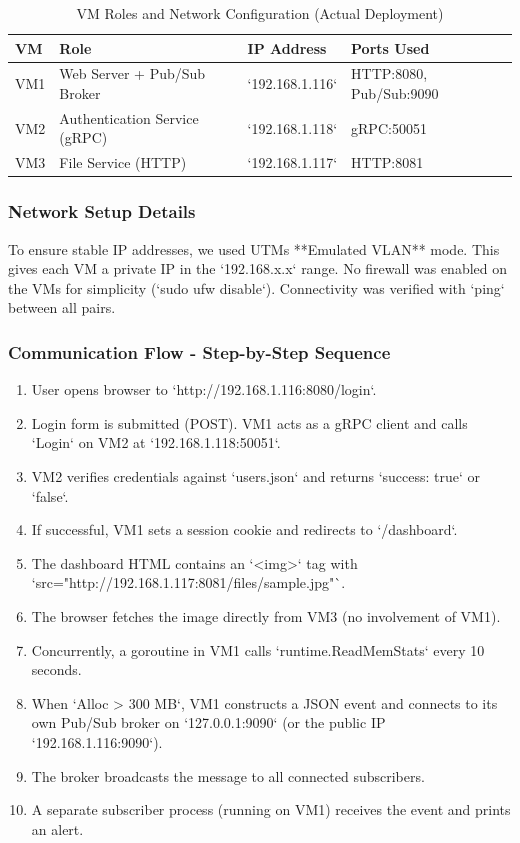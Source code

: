 \documentclass[a4paper]{article}
\begin{document}
\begin{table}[H]
\centering
\caption{VM Roles and Network Configuration (Actual Deployment)}
\label{tab:vmconfig}\begin{tabular}{|l|l|l|l|}
\hline
\textbf{VM} & \textbf{Role} & \textbf{IP Address} & \textbf{Ports Used} \\ \hline
VM1 & Web Server + Pub/Sub Broker & `192.168.1.116` & HTTP:8080, Pub/Sub:9090 \\ \hline
VM2 & Authentication Service (gRPC) & `192.168.1.118` & gRPC:50051 \\ \hline
VM3 & File Service (HTTP) & `192.168.1.117` & HTTP:8081 \\ \hline
\end{tabular}
\end{table}

\subsubsection{Network Setup Details}
To ensure stable IP addresses, we used UTMs **Emulated VLAN** mode. This gives each VM a private IP in the `192.168.x.x` range. No firewall was enabled on the VMs for simplicity (`sudo ufw disable`). Connectivity was verified with `ping` between all pairs.

\subsubsection{Communication Flow - Step-by-Step Sequence}
\begin{enumerate}
    \item User opens browser to `http://192.168.1.116:8080/login`.
    \item Login form is submitted (POST). VM1 acts as a gRPC client and calls `Login` on VM2 at `192.168.1.118:50051`.
    \item VM2 verifies credentials against `users.json` and returns `success: true` or `false`.
    \item If successful, VM1 sets a session cookie and redirects to `/dashboard`.
    \item The dashboard HTML contains an `<img>` tag with `src="http://192.168.1.117:8081/files/sample.jpg"`.
    \item The browser fetches the image directly from VM3 (no involvement of VM1).
    \item Concurrently, a goroutine in VM1 calls `runtime.ReadMemStats` every 10 seconds.
    \item When `Alloc > 300 MB`, VM1 constructs a JSON event and connects to its own Pub/Sub broker on `127.0.0.1:9090` (or the public IP `192.168.1.116:9090`).
    \item The broker broadcasts the message to all connected subscribers.
    \item A separate subscriber process (running on VM1) receives the event and prints an alert.
\end{enumerate}
\end{document}
